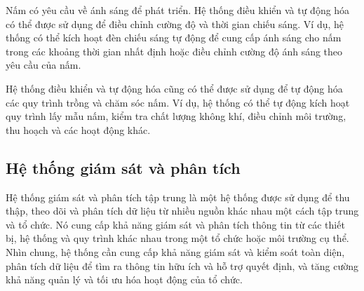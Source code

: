 Nấm có yêu cầu về ánh sáng để phát triển. Hệ thống điều khiển và tự động hóa có thể được sử dụng để điều chỉnh cường độ và thời gian chiếu sáng. Ví dụ, hệ thống có thể kích hoạt đèn chiếu sáng tự động để cung cấp ánh sáng cho nấm trong các khoảng thời gian nhất định hoặc điều chỉnh cường độ ánh sáng theo yêu cầu của nấm.

Hệ thống điều khiển và tự động hóa cũng có thể được sử dụng để tự động hóa các quy trình trồng và chăm sóc nấm. Ví dụ, hệ thống có thể tự động kích hoạt quy trình lấy mẫu nấm, kiểm tra chất lượng không khí, điều chỉnh môi trường, thu hoạch và các hoạt động khác.
    
\subsection{Hệ thống giám sát và phân tích}

Hệ thống giám sát và phân tích tập trung là một hệ thống được sử dụng để thu thập, theo dõi và phân tích dữ liệu từ nhiều nguồn khác nhau một cách tập trung và tổ chức. Nó cung cấp khả năng giám sát và phân tích thông tin từ các thiết bị, hệ thống và quy trình khác nhau trong một tổ chức hoặc môi trường cụ thể. Nhìn chung, hệ thống cần cung cấp khả năng giám sát và kiểm soát toàn diện, phân tích dữ liệu để tìm ra thông tin hữu ích và hỗ trợ quyết định, và tăng cường khả năng quản lý và tối ưu hóa hoạt động của tổ chức.

